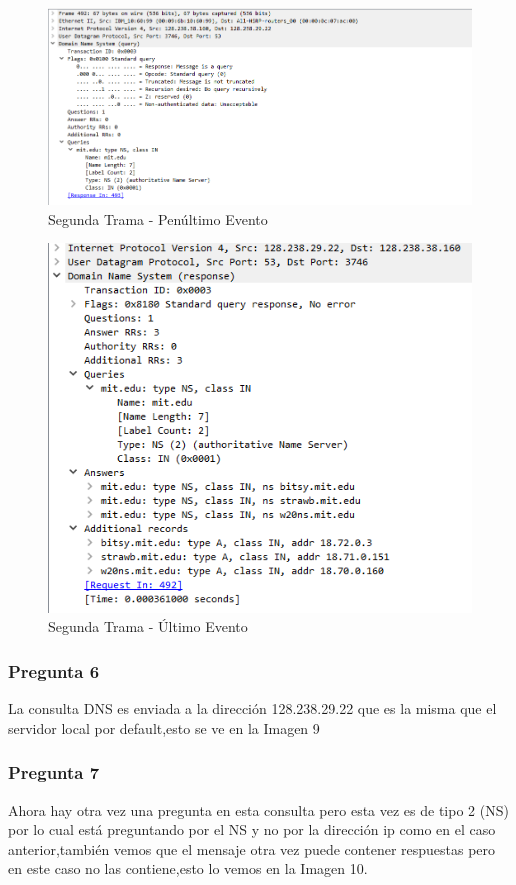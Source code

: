 \documentclass{article}
\begin{document}
\begin{figure}
    \centering
    \includegraphics[width=1\linewidth]{Fotos/SegundaTramaPrimerEvento.png}
    \caption{Segunda Trama - Penúltimo Evento}
\end{figure}

\begin{figure}
    \centering
    \includegraphics[width=0.75\linewidth]{Fotos/SegundaTramaSegundoEvento.png}
    \caption{Segunda Trama - Último Evento}
\end{figure}

\newpage

\subsubsection{Pregunta 6}
La consulta DNS es enviada a la dirección 128.238.29.22 que es la misma que el servidor local por default,esto se ve en la Imagen 9

\subsubsection{Pregunta 7}
Ahora hay otra vez una pregunta en esta consulta pero esta vez es de tipo 2 (NS)  por lo cual está preguntando por el NS y no por la dirección ip como en el caso anterior,también vemos que el mensaje otra vez puede contener respuestas pero en este caso no las contiene,esto lo vemos en la Imagen 10.
\end{document}
